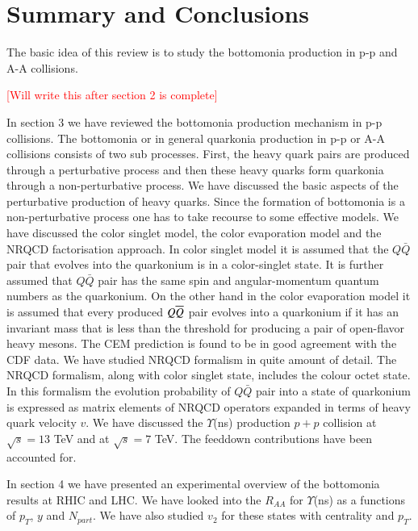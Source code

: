 \section{Summary and Conclusions}
\label{sec:conclusions}
The basic idea of this review is to study the bottomonia production in p-p and A-A collisions. 

\textcolor{red}{[Will write this after section 2 is complete]}

In section 3 we have reviewed the bottomonia production mechanism in p-p 
collisions. The bottomonia or in general quarkonia production in p-p or A-A collisions consists of two 
sub processes. First, the heavy quark pairs are produced through a perturbative process and then 
these heavy quarks form quarkonia through a non-perturbative process. We have discussed the basic 
aspects of the perturbative production of heavy quarks. Since the formation of bottomonia 
is a non-perturbative process one has to take recourse to some effective models. We have discussed the 
color singlet model, the color evaporation model and the NRQCD factorisation approach. In color singlet  
model  it is assumed that the $Q\bar Q$ pair that evolves into
the quarkonium is in a color-singlet state. It is further assumed  that  $Q\bar Q$ pair   has the same spin
and angular-momentum quantum numbers as the quarkonium. On the other hand in the color evaporation 
model   it
is assumed that every produced $Q \overline{Q}$ pair evolves into a quarkonium
if it has an invariant mass that is less than the threshold for
producing a pair of open-flavor heavy mesons. The CEM prediction is found to be in good agreement 
with the CDF data. We have studied NRQCD formalism in quite amount of detail. The NRQCD formalism, 
along with color singlet state, includes the colour octet state. In this formalism the evolution probability of $Q\bar{Q}$
pair into a state of quarkonium is expressed as matrix elements of NRQCD operators expanded
in terms of heavy quark velocity $v$. We have discussed the $\Upsilon$(ns) production $p+p$ collision 
at $\sqrt s = 13$ TeV and at $\sqrt s =7$ TeV. The feeddown contributions have been accounted for. 

In section 4 we have presented an experimental overview of the bottomonia results at RHIC and LHC. 
We have looked into the $R_{AA}$ for $\Upsilon$(ns) as a functions of $p_T$, $y$ and $N_{part}$. 
We have also studied $v_2$ for these states with centrality and $p_T$. 

